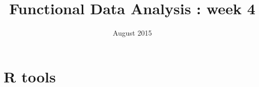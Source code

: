 \documentclass{article}
\title{Functional Data Analysis : week 4}
\date{August 2015}
\begin{document}
\maketitle

\section{R tools}



\end{document}
